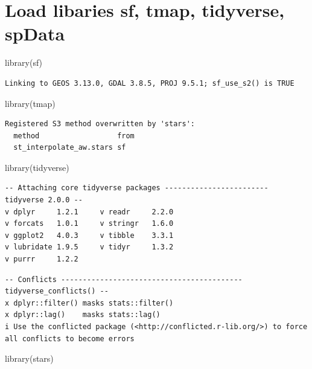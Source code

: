 \documentclass[
  letterpaper,
  DIV=11,
  numbers=noendperiod]{scrartcl}
\newenvironment{Shaded}{\begin{snugshade}}{\end{snugshade}}
\newcommand{\FunctionTok}[1]{\textcolor[rgb]{0.28,0.35,0.67}{#1}}
\newcommand{\NormalTok}[1]{\textcolor[rgb]{0.00,0.23,0.31}{#1}}
\begin{document}
\section{Load libaries sf, tmap, tidyverse,
spData}\label{load-libaries-sf-tmap-tidyverse-spdata}

\begin{Shaded}
\begin{Highlighting}[]
\FunctionTok{library}\NormalTok{(sf)}
\end{Highlighting}
\end{Shaded}

\begin{verbatim}
Linking to GEOS 3.13.0, GDAL 3.8.5, PROJ 9.5.1; sf_use_s2() is TRUE
\end{verbatim}

\begin{Shaded}
\begin{Highlighting}[]
\FunctionTok{library}\NormalTok{(tmap)}
\end{Highlighting}
\end{Shaded}

\begin{verbatim}
Registered S3 method overwritten by 'stars':
  method                  from
  st_interpolate_aw.stars sf  
\end{verbatim}

\begin{Shaded}
\begin{Highlighting}[]
\FunctionTok{library}\NormalTok{(tidyverse)}
\end{Highlighting}
\end{Shaded}

\begin{verbatim}
-- Attaching core tidyverse packages ------------------------ tidyverse 2.0.0 --
v dplyr     1.2.1     v readr     2.2.0
v forcats   1.0.1     v stringr   1.6.0
v ggplot2   4.0.3     v tibble    3.3.1
v lubridate 1.9.5     v tidyr     1.3.2
v purrr     1.2.2     
\end{verbatim}

\begin{verbatim}
-- Conflicts ------------------------------------------ tidyverse_conflicts() --
x dplyr::filter() masks stats::filter()
x dplyr::lag()    masks stats::lag()
i Use the conflicted package (<http://conflicted.r-lib.org/>) to force all conflicts to become errors
\end{verbatim}

\begin{Shaded}
\begin{Highlighting}[]
\FunctionTok{library}\NormalTok{(stars)}
\end{Highlighting}
\end{Shaded}
\end{document}
